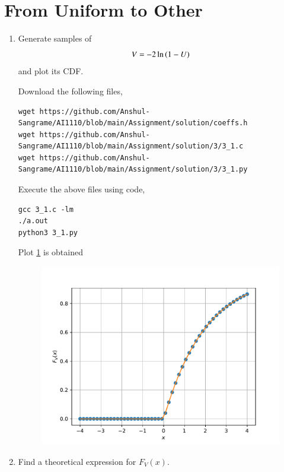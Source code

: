 \documentclass[journal,12pt,twocolumn]{IEEEtran}
\renewcommand\thesection{\arabic{section}}
\begin{document}
\section{From Uniform to Other}
\begin{enumerate}[label=\thesection.\arabic*
,ref=\thesection.\theenumi]
%
\item
Generate samples of 
%
\begin{equation}
V = -2\ln\left(1-U\right)
\end{equation}
%
and plot its CDF.
 
\solution

Download the following files,
\begin{lstlisting}
wget https://github.com/Anshul-Sangrame/AI1110/blob/main/Assignment/solution/coeffs.h
wget https://github.com/Anshul-Sangrame/AI1110/blob/main/Assignment/solution/3/3_1.c
wget https://github.com/Anshul-Sangrame/AI1110/blob/main/Assignment/solution/3/3_1.py
\end{lstlisting}
Execute the above files using code,
\begin{lstlisting}
gcc 3_1.c -lm
./a.out
python3 3_1.py
\end{lstlisting}
Plot \ref{fig:3.1} is obtained
\begin{figure}[!ht]
    \centering
    \includegraphics[width=\columnwidth]{../figs/V_cdf.pdf}
    \caption{}
    \label{fig:3.1}
\end{figure}
%
\item Find a theoretical expression for $F_V(x)$.

\solution


\end{enumerate}
\end{document}
